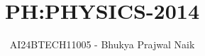 \documentclass[journal]{IEEEtran}
\begin{document}

\vspace{3cm}

\title{PH:PHYSICS-2014}
\author{AI24BTECH11005 - Bhukya Prajwal Naik
}
{\let\newpage\relax\maketitle}

\renewcommand{\thefigure}{\theenumi}
\renewcommand{\thetable}{\theenumi}
\setlength{\intextsep}{10pt} %


\renewcommand{\thetable}{\theenumi}
\end{document}
